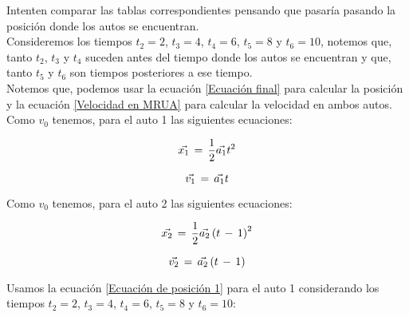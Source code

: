 \documentclass[letterpaper, 12pt]{article}
\begin{document}
\begin{enumerate}
\begin{enumerate}
            Intenten comparar las tablas correspondientes pensando que pasaría pasando la posición donde los autos se encuentran.\\
            
            Consideremos los tiempos $t_{2} = 2$, $t_{3} = 4$, $t_{4} = 6$, $t_{5} = 8$ y $t_{6} = 10$, notemos que, tanto $t_{2}$, $t_{3}$ y $t_{4}$ suceden antes del tiempo donde los autos se encuentran y que, tanto $t_{5}$ y $t_{6}$ son tiempos posteriores a ese tiempo.\\
            
            Notemos que, podemos usar la ecuación \ref{Ecuación final} para calcular la posición y la ecuación \ref{Velocidad en MRUA} para calcular la velocidad en ambos autos.\\
            
            Como $v_{0}$ tenemos, para el auto 1 las siguientes ecuaciones:
            
            \begin{equation}
                \label{Ecuación de posición 1}
                \vec{x_{1}} \thinspace = \thinspace \frac{1}{2} \vec{a_{1}}t^{2}
            \end{equation}
            
            \begin{equation}
                \label{Velocidad carro 1}
                \vec{v_{1}} \thinspace = \thinspace \vec{a_{1}}t
            \end{equation}
            
            Como $v_{0}$ tenemos, para el auto 2 las siguientes ecuaciones:
            
            \begin{equation}
                \label{Ecuación de posición 2}
                \vec{x_{2}} \thinspace = \thinspace \frac{1}{2} \vec{a_{2}}\left(t \thinspace - \thinspace 1 \right)^{2}
            \end{equation}
            
            \begin{equation}
                \label{Velocidad carro 2}
                \vec{v_{2}} \thinspace = \thinspace \vec{a_{2}}\left(t \thinspace - \thinspace 1 \right)
            \end{equation}
            
            Usamos la ecuación \ref{Ecuación de posición 1} para el auto 1 considerando los tiempos $t_{2} = 2$, $t_{3} = 4$, $t_{4} = 6$, $t_{5} = 8$ y $t_{6} = 10$:
            

\end{enumerate}
\end{enumerate}
\end{document}
